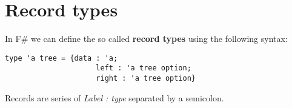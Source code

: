 \section{Record types}
In F\# we can define the so called \textbf{record types} using the following syntax:
\begin{lstlisting}[style = FSharpStyle]
    type 'a tree = {data : 'a;
                     left : 'a tree option;
                     right : 'a tree option}
\end{lstlisting}
Records are series of \textit{Label : type} separated by a semicolon.

